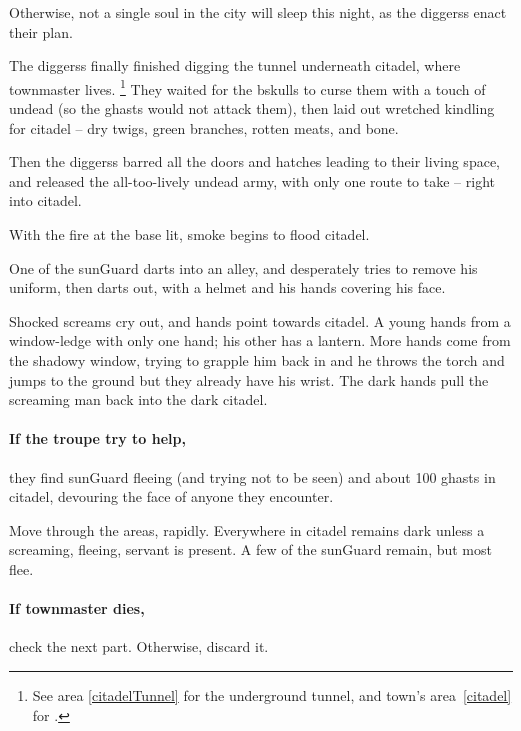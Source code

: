 Otherwise, not a single soul in the city will sleep this night, as the \glspl{diggers} enact their plan.

\begin{exampletext}
  The \glspl{diggers} finally finished digging the tunnel underneath \gls{citadel}, where \gls{townmaster} lives.%
  \footnote{See \gls{area} \vref{citadelTunnel} for the underground tunnel, and \gls{town}'s \gls{area}~\vref{citadel} for .}
  They waited for the \gls{bskulls} to curse them with a touch of undead (so the ghasts would not attack them), then laid out wretched kindling for \gls{citadel} -- dry twigs, green branches, rotten meats, and bone.

  Then the \glspl{diggers} barred all the doors and hatches leading to their living space, and released the all-too-lively undead army, with only one route to take -- right into \gls{citadel}.

  With the fire at the base lit, smoke begins to flood \gls{citadel}.
\end{exampletext}

\begin{boxtext}
  One of the \gls{sunGuard} darts into an alley, and desperately tries to remove his uniform, then darts out, with a helmet and his hands covering his face.

  Shocked screams cry out, and hands point towards \gls{citadel}.
  A young hands from a window-ledge with only one hand; his other has a lantern.
  More hands come from the shadowy window, trying to grapple him back in and he throws the \gls{torch} and jumps to the ground but they already have his wrist.
  The dark hands pull the screaming man back into the dark citadel.
\end{boxtext}

\paragraph{If the troupe try to help,}
they find \gls{sunGuard} fleeing (and trying not to be seen) and about 100 ghasts in \gls{citadel}, devouring the face of anyone they encounter.

Move through the areas, rapidly.
Everywhere in \gls{citadel} remains dark unless a screaming, fleeing, servant is present.
A few of the \gls{sunGuard} remain, but most flee.


\paragraph{If \gls{townmaster} dies,}
check the next part.
Otherwise, discard it.

